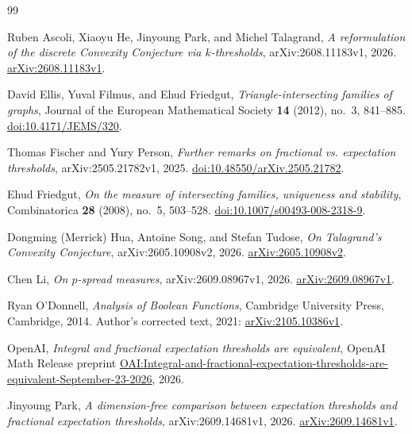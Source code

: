 \documentclass[11pt,letterpaper]{article}
\theoremstyle{definition}
\theoremstyle{remark}
\numberwithin{equation}{section}
\begin{document}
\begin{thebibliography}{99}

Ruben Ascoli, Xiaoyu He, Jinyoung Park, and Michel Talagrand,
\emph{A reformulation of the discrete Convexity Conjecture via
$k$-thresholds},
arXiv:2608.11183v1, 2026.
\href{https://arxiv.org/abs/2608.11183v1}{arXiv:2608.11183v1}.

David Ellis, Yuval Filmus, and Ehud Friedgut,
\emph{Triangle-intersecting families of graphs},
Journal of the European Mathematical Society \textbf{14} (2012),
no.~3, 841--885.
\href{https://doi.org/10.4171/JEMS/320}{doi:10.4171/JEMS/320}.

Thomas Fischer and Yury Person,
\emph{Further remarks on fractional vs. expectation thresholds},
arXiv:2505.21782v1, 2025.
\href{https://doi.org/10.48550/arXiv.2505.21782}{doi:10.48550/arXiv.2505.21782}.

Ehud Friedgut,
\emph{On the measure of intersecting families, uniqueness and stability},
Combinatorica \textbf{28} (2008), no.~5, 503--528.
\href{https://doi.org/10.1007/s00493-008-2318-9}{doi:10.1007/s00493-008-2318-9}.

Dongming (Merrick) Hua, Antoine Song, and Stefan Tudose,
\emph{On Talagrand's Convexity Conjecture},
arXiv:2605.10908v2, 2026.
\href{https://arxiv.org/abs/2605.10908v2}{arXiv:2605.10908v2}.

Chen Li,
\emph{On $p$-spread measures},
arXiv:2609.08967v1, 2026.
\href{https://arxiv.org/abs/2609.08967v1}{arXiv:2609.08967v1}.

Ryan O'Donnell,
\emph{Analysis of Boolean Functions},
Cambridge University Press, Cambridge, 2014.
Author's corrected text, 2021:
\href{https://arxiv.org/abs/2105.10386v1}{arXiv:2105.10386v1}.

OpenAI,
\emph{Integral and fractional expectation thresholds are equivalent},
OpenAI Math Release preprint
\href{https://github.com/openai/math/blob/main/preprints/Integral-and-fractional-expectation-thresholds-are-equivalent-September-23-2026/paper.pdf}{OAI:Integral-and-fractional-expectation-thresholds-are-equivalent-September-23-2026},
2026.

Jinyoung Park,
\emph{A dimension-free comparison between expectation thresholds and
fractional expectation thresholds},
arXiv:2609.14681v1, 2026.
\href{https://arxiv.org/abs/2609.14681v1}{arXiv:2609.14681v1}.


\end{thebibliography}
\end{document}
